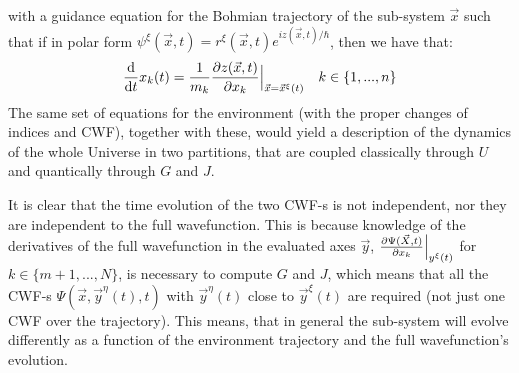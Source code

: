 \documentclass[11pt, a4paper]{article} %
\begin{document}
with a guidance equation for the Bohmian trajectory of the sub-system $\vec{x}$ such that if in polar form $\psi^\xi (\vec{x},t)=r^\xi(\vec{x},t)e^{iz(\vec{x},t)/\hbar}$, then we have that:
\begin{equation}
\dv{}{t}x_k(t)=\frac{1}{m_k}\pdv{z(\vec{x},t)}{x_k}\Big\rvert_{\vec{x}=\vec{x}^\xi(t)} \quad k\in\{1,...,n\}
\end{equation}
The same set of equations for the environment (with the proper changes of indices and CWF), together with these, would yield a description of the dynamics of the whole Universe in two partitions, that are coupled classically through $U$ and quantically through $G$ and $J$.

It is clear that the time evolution of the two CWF-s is not independent, nor they are independent to the full wavefunction. This is because knowledge of the derivatives of the full wavefunction in the evaluated axes $\vec{y}$, $\pdv{\Psi(\vec{X},t)}{x_k}\Big\rvert_{y^\xi(t)}$ for $k\in\{m+1,...,N\}$, is necessary to compute $G$ and $J$, which means that all the CWF-s $\Psi(\vec{x},\vec{y}^\eta(t),t)$ with $\vec{y}^\eta(t)$ close to $\vec{y}^\xi(t)$ are required (not just one CWF over the trajectory). This means, that in general the sub-system will evolve differently as a function of the environment trajectory and the full wavefunction's evolution.
\end{document}
